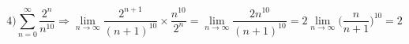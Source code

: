$$
4) \sum_{n=0}^\infty \dfrac{2^n}{n^{10}}
  \Rightarrow
  \lim_{n \to \infty} \dfrac{2^{n+1}}{(n+1)^{10}} \times \dfrac{n^{10}}{2^n}
=  \lim_{n \to \infty} \dfrac{2n^{10} }{(n+1)^{10} }
=  2 \lim_{n \to \infty} \Big( \dfrac{n}{n+1} \Big)^{10}
= 2
$$

